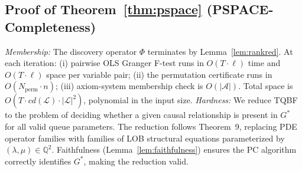 \documentclass[12pt]{article}
\begin{document}
\subsection{Proof of Theorem~\ref{thm:pspace} (PSPACE-Completeness)}
\textit{Membership:}
The discovery operator $\Phi$ terminates by Lemma~\ref{lem:rankred}.
At each iteration: (i) pairwise OLS Granger F-test runs in
$O(T \cdot \ell)$ time and $O(T \cdot \ell)$ space per variable pair;
(ii) the permutation certificate runs in $O(N_{\mathrm{perm}} \cdot n)$;
(iii) axiom-system membership check is $O(|\mathcal{A}|)$.
Total space is $O(T \cdot cd(\mathcal{L}) \cdot |\mathcal{L}|^2)$,
polynomial in the input size.
\textit{Hardness:}
We reduce TQBF to the problem of deciding whether a given causal
relationship is present in $G^*$ for all valid queue parameters.
The reduction follows \citet{maes2026c} Theorem~9,
replacing PDE operator families with families of LOB structural equations
parameterized by $(\lambda, \mu) \in \mathbb{Q}^2$.
Faithfulness (Lemma~\ref{lem:faithfulness}) ensures the PC algorithm
correctly identifies $G^*$, making the reduction valid.
\end{document}
